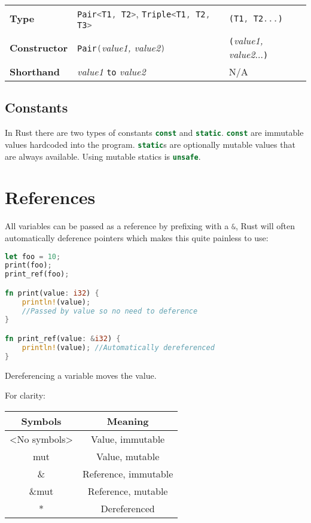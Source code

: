 \documentclass[a4paper,11pt]{article}
\begin{document}
\begin{center}
\begin{tabular}{ |>{\raggedright\arraybackslash}p{2.5cm}|>{\raggedright\arraybackslash}p{5.8cm}|>{\raggedright\arraybackslash}p{5.8cm}| }
 \hline
 \multicolumn{3}{|c|}{\textbf{Tuples}} \\
 \hline
 \textbf{Type} & \lstinline[language=Kotlin]|Pair<T1, T2>|, \lstinline[language=Kotlin]|Triple<T1, T2, T3>| & \lstinline[language=Rust]|(T1, T2...)| \\
 \textbf{Constructor} & \lstinline[language=Kotlin]|Pair(|\emph{value1, value2}\lstinline[language=Kotlin]|)| &  \lstinline[language=Rust]|(|\emph{value1, value2}...\lstinline[language=Rust]|)| \\
 \textbf{Shorthand} & \emph{value1} \lstinline[language=Kotlin]|to| \emph{value2} & N/A \\
 \hline
\end{tabular}
\end{center}
\subsection{Constants}
In Rust there are two types of constants \lstinline[language=Rust]{const} and \lstinline[language=Rust]{static}. \lstinline[language=Rust]{const} are immutable values hardcoded into the program. \lstinline[language=Rust]{static}s are optionally mutable values that are always available. Using mutable statics is \lstinline[language=Rust]{unsafe}.

\newpage
\section{References}
All variables can be passed as a reference by prefixing with a \lstinline[language=Rust]{&}, Rust will often automatically deference pointers which makes this quite painless to use:
\begin{lstlisting}[language=Rust,frame=single]
let foo = 10;
print(foo);
print_ref(foo);

fn print(value: i32) {
	println!(value); 
	//Passed by value so no need to deference
}

fn print_ref(value: &i32) {
	println!(value); //Automatically dereferenced
}

\end{lstlisting}

Dereferencing a variable moves the value.

For clarity:
\begin{center}
\begin{tabular}{ c|c } 
 Symbols & Meaning \\ 
 \hline
 <No symbols> & Value, immutable \\ 
 mut & Value, mutable \\ 
 \& & Reference, immutable \\ 
 \&mut & Reference, mutable \\
 \** & Dereferenced 
\end{tabular}
\end{center}
\end{document}
